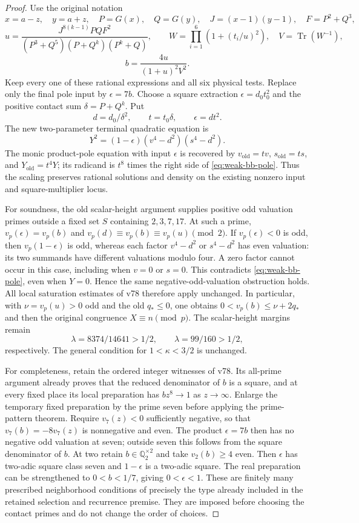 \documentclass[11pt]{article}
\begin{document}
\begin{proof}
Use the original notation
\[
 x=a-z,\quad y=a+z,\quad P=G(x),\quad Q=G(y),
 \quad J=(x-1)(y-1),\quad F=P^2+Q^3,
\]
\[
 u=\frac{J^{8(k-1)}PQF^2}
 {(P^3+Q^5)(P+Q^k)(P^k+Q)},\qquad
 W=\prod_{i=1}^6(1+(t_i/u)^2),\quad V=\operatorname{Tr}(W^{-1}),
\]
\[
 b=\frac{4u}{(1+u)^2V^2}.
\]
Keep every one of these rational expressions and all six physical tests.
Replace only the final pole input by $\epsilon=7b$. Choose a square
extraction $\epsilon=d_0t_0^2$ and the positive contact sum
$\delta=P+Q^k$. Put
\[
 d=d_0/\delta^2,\qquad t=t_0\delta,
 \qquad \epsilon=dt^2.
\]
The new two-parameter terminal quadratic equation is
\begin{equation}\label{eq:weak-bb-pole}
 Y^2=(1-\epsilon)(v^4-d^2)(s^4-d^2).
\end{equation}
The monic product-pole equation with input $\epsilon$ is recovered by
$v_{\mathrm{old}}=tv$, $s_{\mathrm{old}}=ts$, and
$Y_{\mathrm{old}}=t^4Y$; its radicand is $t^8$ times the right side of
\eqref{eq:weak-bb-pole}. Thus the scaling preserves rational solutions
and density on the existing nonzero input and square-multiplier locus.

For soundness, the old scalar-height argument supplies positive odd
valuation primes outside a fixed set $S$ containing $2,3,7,17$.
At such a prime, $v_p(\epsilon)=v_p(b)$ and
$v_p(d)\equiv v_p(b)\equiv v_p(u)\pmod2$. If $v_p(\epsilon)<0$ is odd,
then $v_p(1-\epsilon)$ is odd, whereas each factor $v^4-d^2$ or
$s^4-d^2$ has even valuation: its two summands have different valuations
modulo four. A zero factor cannot occur in this case, including when
$v=0$ or $s=0$. This contradicts \eqref{eq:weak-bb-pole}, even when
$Y=0$. Hence the same negative-odd-valuation obstruction holds.
All local saturation estimates of v78 therefore apply unchanged. In
particular, with $\nu=v_p(u)>0$ odd and the old $q_*\le0$, one obtains
$0<v_p(b)\le\nu+2q_*$ and then the original congruence $X\equiv n\pmod p$.
The scalar-height margins remain
\[
 \lambda=8374/14641>1/2,
 \qquad \lambda=99/160>1/2,
\]
respectively. The general condition for $1<\kappa<3/2$ is unchanged.

For completeness, retain the ordered integer witnesses of v78. Its
all-prime argument already proves that the reduced denominator of $b$
is a square, and at every fixed place its local preparation has
$b z^8\longrightarrow1$ as $z\longrightarrow\infty$.
Enlarge the temporary fixed preparation by the prime seven before
applying the prime-pattern theorem. Require $v_7(z)<0$ sufficiently
negative, so that $v_7(b)=-8v_7(z)$ is nonnegative and even. The product
$\epsilon=7b$ then has no negative odd valuation at seven; outside seven
this follows from the square denominator of $b$.
At two retain $b\in\mathbb Q_2^{\times2}$ and take
$v_2(b)\ge4$ even. Then $\epsilon$ has two-adic square class seven and
$1-\epsilon$ is a two-adic square. The real preparation can be strengthened
to $0<b<1/7$, giving $0<\epsilon<1$. These are finitely many prescribed
neighborhood conditions of precisely the type already included in the
retained selection and recurrence premise. They are imposed before
choosing the contact primes and do not change the order of choices.


\end{proof}
\end{document}
